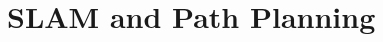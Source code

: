 \documentclass[letterpaper, 10 pt, conference]{ieeeconf}  %
\begin{document}
 



\section{SLAM and Path Planning}

\end{document}
